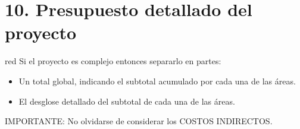 \documentclass[11pt]{charter}
\begin{document}
\section{10. Presupuesto detallado del proyecto}
\label{sec:presupuesto}

\begin{consigna}{red}
Si el proyecto es complejo entonces separarlo en partes:
\begin{itemize}
\item Un total global, indicando el subtotal acumulado por cada una de las áreas.
\item El desglose detallado del subtotal de cada una de las áreas.
\end{itemize}

IMPORTANTE: No olvidarse de considerar los COSTOS INDIRECTOS.

\end{consigna}
\end{document}
